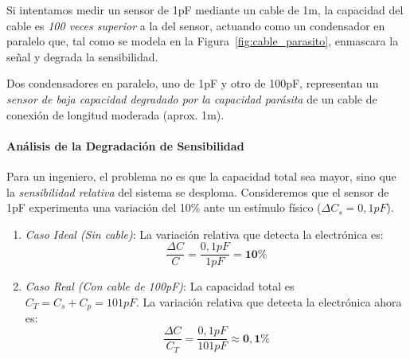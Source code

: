 Si intentamos medir un sensor de \unit{1}{pF} mediante un cable de \unit{1}{m}, la capacidad del cable es \emph{100 veces superior} a la del sensor, actuando como un condensador en paralelo que, tal como se modela en la Figura~\ref{fig:cable_parasito}, enmascara la señal y degrada la sensibilidad.
%
\begin{marginfigure}[0em]
    \centering
    \shorthandoff{>}
    \caption[Efecto de la capacidad parásita del cable.]{Efecto de la capacidad parásita del cable. $C_p$ aparece en paralelo con el sensor, sumándose a la medida y reduciendo drásticamente la variación relativa $\Delta C/C_{total}$.}\label{fig:cable_parasito}
\end{marginfigure}
%
Dos condensadores en paralelo, uno de \unit{1}{pF} y otro de \unit{100}{pF}, representan un \emph{sensor de baja capacidad degradado por la capacidad parásita} de un cable de conexión de longitud moderada (aprox. \unit{1}{m}). 

\paragraph{Análisis de la Degradación de Sensibilidad}
Para un ingeniero, el problema no es que la capacidad total sea mayor, sino que la \emph{sensibilidad relativa} del sistema se desploma. Consideremos que el sensor de \unit{1}{pF} experimenta una variación del \unit{10}{\%} ante un estímulo físico ($\Delta C_s = \unit{0,1}{pF}$).

\begin{enumerate}
    \item \emph{Caso Ideal (Sin cable)}: 
    La variación relativa que detecta la electrónica es:
    \[ \frac{\Delta C}{C} = \frac{\unit{0,1}{pF}}{\unit{1}{pF}} = \mathbf{\unit{10}{\%}} \]
    
    \item \emph{Caso Real (Con cable de \unit{100}{pF})}:
    La capacidad total es $C_T = C_s + C_p = \unit{101}{pF}$. La variación relativa que detecta la electrónica ahora es:
    \[ \frac{\Delta C}{C_T} = \frac{\unit{0,1}{pF}}{\unit{101}{pF}} \approx \mathbf{\unit{0,1}{\%}} \]
\end{enumerate}

